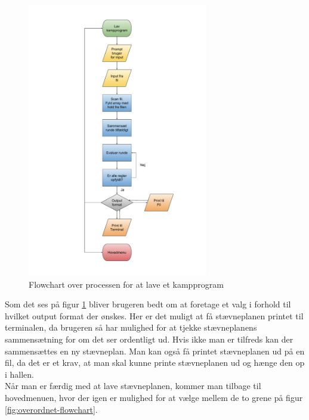 \begin{figure}[H]
  \centering
  \includegraphics[width=0.7\textwidth]{figures/Lavflowchart.pdf}
  \caption{Flowchart over processen for at lave et kampprogram}
  \label{fig:lav-flowchart}
\end{figure}

Som det ses på figur \ref{fig:lav-flowchart} bliver brugeren bedt om at foretage et valg i forhold til hvilket output format der ønskes. Her er det muligt at få stævneplanen printet til terminalen, da brugeren så har mulighed for at tjekke stævneplanens sammensætning for om det ser ordentligt ud. Hvis ikke man er tilfreds kan der sammensættes en ny stævneplan. Man kan også få printet stævneplanen ud på en fil, da det er et krav, at man skal kunne printe stævneplanen ud og hænge den op i hallen.\\
Når man er færdig med at lave stævneplanen, kommer man tilbage til hovedmenuen, hvor der igen er mulighed for at vælge mellem de to grene på figur \ref{fig:overordnet-flowchart}.

